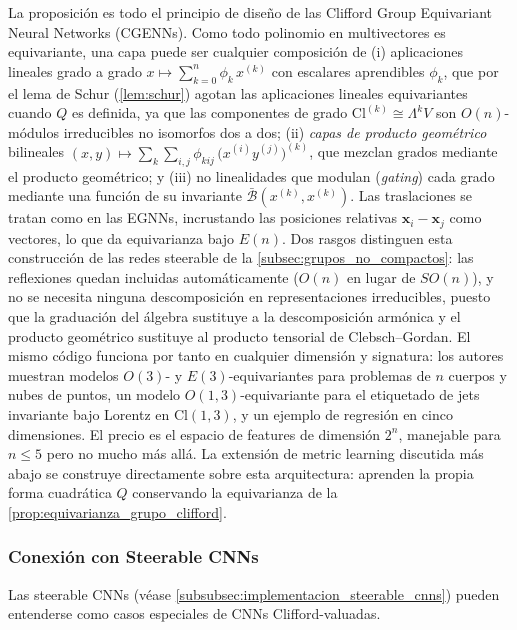 La proposición es todo el principio de diseño de las Clifford Group Equivariant Neural Networks (CGENNs). Como todo polinomio en multivectores es equivariante, una capa puede ser cualquier composición de (i) aplicaciones lineales grado a grado $x \mapsto \sum_{k=0}^{n} \phi_k\, x^{(k)}$ con escalares aprendibles $\phi_k$, que por el lema de Schur (\autoref{lem:schur}) agotan las aplicaciones lineales equivariantes cuando $Q$ es definida, ya que las componentes de grado $\mathrm{Cl}^{(k)} \cong \Lambda^k V$ son $O(n)$-módulos irreducibles no isomorfos dos a dos; (ii) \emph{capas de producto geométrico} bilineales $(x, y) \mapsto \sum_{k}\sum_{i,j} \phi_{kij}\, \big(x^{(i)} y^{(j)}\big)^{(k)}$, que mezclan grados mediante el producto geométrico; y (iii) no linealidades que modulan (\textit{gating}) cada grado mediante una función de su invariante $\bar{\mathcal{B}}(x^{(k)}, x^{(k)})$. Las traslaciones se tratan como en las EGNNs, incrustando las posiciones relativas $\mathbf{x}_i - \mathbf{x}_j$ como vectores, lo que da equivarianza bajo $E(n)$. Dos rasgos distinguen esta construcción de las redes steerable de la \autoref{subsec:grupos_no_compactos}: las reflexiones quedan incluidas automáticamente ($O(n)$ en lugar de $SO(n)$), y no se necesita ninguna descomposición en representaciones irreducibles, puesto que la graduación del álgebra sustituye a la descomposición armónica y el producto geométrico sustituye al producto tensorial de Clebsch--Gordan. El mismo código funciona por tanto en cualquier dimensión y signatura: los autores muestran modelos $O(3)$- y $E(3)$-equivariantes para problemas de $n$ cuerpos y nubes de puntos, un modelo $O(1,3)$-equivariante para el etiquetado de jets invariante bajo Lorentz en $\text{Cl}(1,3)$, y un ejemplo de regresión en cinco dimensiones. El precio es el espacio de features de dimensión $2^n$, manejable para $n \le 5$ pero no mucho más allá. La extensión de metric learning discutida más abajo se construye directamente sobre esta arquitectura: \citet{ali2024metriclearning} aprenden la propia forma cuadrática $Q$ conservando la equivarianza de la \autoref{prop:equivarianza_grupo_clifford}.

\subsubsection{Conexión con Steerable CNNs}

Las steerable CNNs (véase \autoref{subsubsec:implementacion_steerable_cnns}) pueden entenderse como casos especiales de CNNs Clifford-valuadas.


